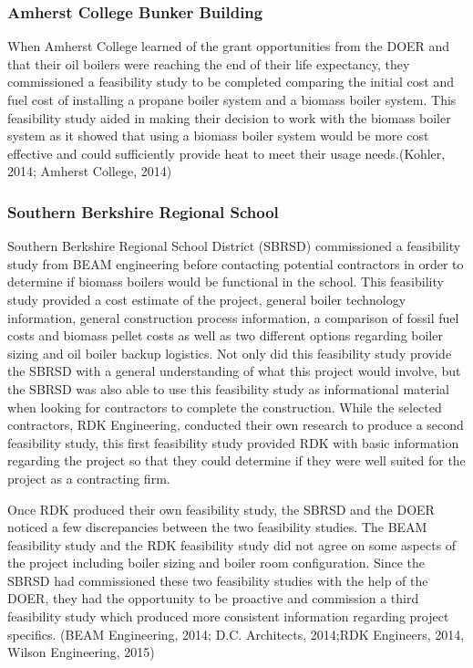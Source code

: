 \subsubsection{Amherst College Bunker Building}
\par When Amherst College learned of the grant opportunities from the DOER and that their oil boilers were reaching the end of their life expectancy, they commissioned a feasibility study to be completed comparing the initial cost and fuel cost of installing a propane boiler system and a biomass boiler system. This feasibility study aided in making their decision to work with the biomass boiler system as it showed that using a biomass boiler system would be more cost effective and could sufficiently provide heat to meet their usage needs.(Kohler, 2014; Amherst College, 2014)

\subsubsection{Southern Berkshire Regional School}
\par Southern Berkshire Regional School District (SBRSD) commissioned a feasibility study from BEAM engineering before contacting potential contractors in order to determine if biomass boilers would be functional in the school. This feasibility study provided a cost estimate of the project, general boiler technology information, general construction process information, a comparison of fossil fuel costs and biomass pellet costs as well as two different options regarding boiler sizing and oil boiler backup logistics. Not only did this feasibility study provide the SBRSD with a general understanding of what this project would involve, but the SBRSD was also able to use this feasibility study as informational material when looking for contractors to complete the construction.  While the selected contractors, RDK Engineering, conducted their own research to produce a second feasibility study, this first feasibility study provided RDK with basic information regarding the project so that they could determine if they were well suited for the project as a contracting firm.
\par Once RDK produced their own feasibility study, the SBRSD and the DOER noticed a few discrepancies between the two feasibility studies. The BEAM feasibility study and the RDK feasibility study did not agree on some aspects of the project including boiler sizing and boiler room configuration. Since the SBRSD had commissioned these two feasibility studies with the help of the DOER, they had the opportunity to be proactive and commission a third feasibility study which produced more consistent information regarding project specifics. (BEAM Engineering, 2014; D.C. Architects, 2014;RDK Engineers, 2014, Wilson Engineering, 2015)

